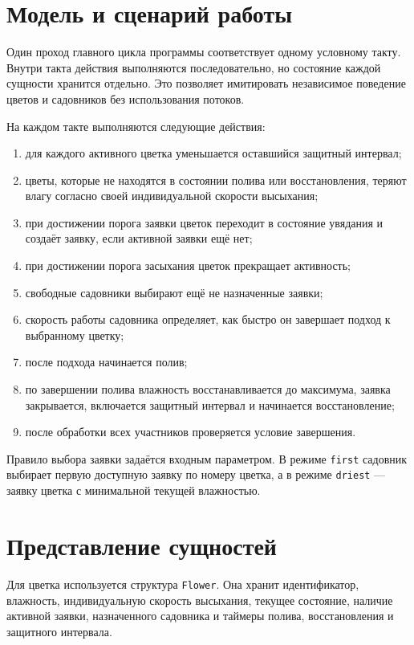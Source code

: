 \documentclass[12pt,a4paper]{article}
\begin{document}
\section{Модель и сценарий работы}

Один проход главного цикла программы соответствует одному условному такту.
Внутри такта действия выполняются последовательно, но состояние каждой сущности
хранится отдельно. Это позволяет имитировать независимое поведение цветов и
садовников без использования потоков.

На каждом такте выполняются следующие действия:
\begin{enumerate}[noitemsep]
    \item для каждого активного цветка уменьшается оставшийся защитный интервал;
    \item цветы, которые не находятся в состоянии полива или восстановления,
          теряют влагу согласно своей индивидуальной скорости высыхания;
    \item при достижении порога заявки цветок переходит в состояние увядания и
          создаёт заявку, если активной заявки ещё нет;
    \item при достижении порога засыхания цветок прекращает активность;
    \item свободные садовники выбирают ещё не назначенные заявки;
    \item скорость работы садовника определяет, как быстро он завершает подход к выбранному цветку;
    \item после подхода начинается полив;
    \item по завершении полива влажность восстанавливается до максимума, заявка закрывается,
          включается защитный интервал и начинается восстановление;
    \item после обработки всех участников проверяется условие завершения.
\end{enumerate}

Правило выбора заявки задаётся входным параметром. В режиме \texttt{first}
садовник выбирает первую доступную заявку по номеру цветка, а в режиме
\texttt{driest} --- заявку цветка с минимальной текущей влажностью.

\section{Представление сущностей}

Для цветка используется структура \texttt{Flower}. Она хранит идентификатор,
влажность, индивидуальную скорость высыхания, текущее состояние, наличие
активной заявки, назначенного садовника и таймеры полива, восстановления и
защитного интервала.
\end{document}
